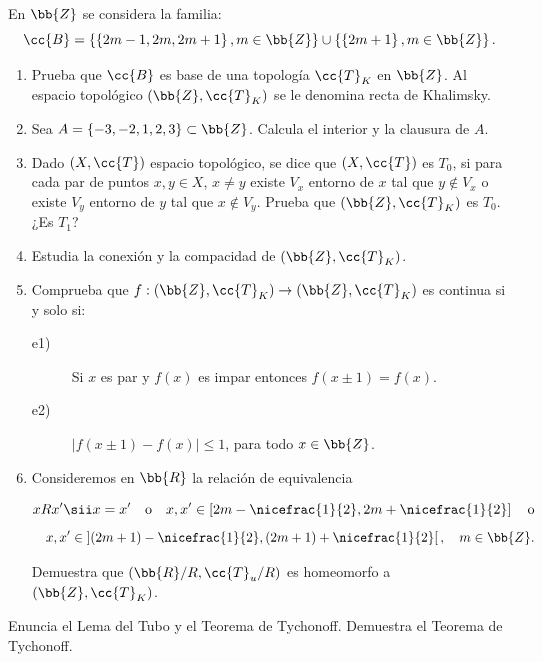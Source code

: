 \documentclass[12pt]{article}
\begin{document}
    \begin{ejercicio}
        En $\bb{Z}$ se considera la familia:
        \[
        \cc{B} = \left\{\left\{2m - 1, 2m, 2m + 1\right\}, m \in \bb{Z}\right\} \cup \left\{\left\{2m + 1\right\}, m \in \bb{Z}\right\}.
        \]
        \begin{enumerate}[label=\alph*)]
            \item Prueba que $\cc{B}$ es base de una topología $\cc{T}_K$ en $\bb{Z}$. Al espacio topológico $(\bb{Z}, \cc{T}_K)$ se le denomina recta de Khalimsky.
            \item Sea $A = \{-3, -2, 1, 2, 3\} \subset \bb{Z}$. Calcula el interior y la clausura de $A$.
            \item Dado $(X, \cc{T})$ espacio topológico, se dice que $(X, \cc{T})$ es $T_0$, si para cada par de puntos $x, y \in X$, $x \neq y$ existe $V_x$ entorno de $x$ tal que $y \notin V_x$ o existe $V_y$ entorno de $y$ tal que $x \notin V_y$. Prueba que $(\bb{Z}, \cc{T}_K)$ es $T_0$. ¿Es $T_1$?
            \item Estudia la conexión y la compacidad de $(\bb{Z}, \cc{T}_K)$.
            \item Comprueba que $f : (\bb{Z}, \cc{T}_K) \to (\bb{Z}, \cc{T}_K)$ es continua si y solo si:
            \begin{description}
                \item[e1)] Si $x$ es par y $f(x)$ es impar entonces $f(x \pm 1) = f(x)$.
                \item[e2)] $|f(x \pm 1) - f(x)| \leq 1$, para todo $x \in \bb{Z}$.
            \end{description}
            \item Consideremos en $\bb{R}$ la relación de equivalencia
            
            $$x R x' \sii x = x' \quad \text{o} \quad x, x' \in \left[2m - \nicefrac{1}{2}, 2m + \nicefrac{1}{2}\right] \quad \text{o} $$ $$ \quad x, x' \in \left](2m+1) - \nicefrac{1}{2}, (2m+1) + \nicefrac{1}{2}\right[, \quad m \in \bb{Z}.$$
            
            Demuestra que $(\bb{R}/R, \cc{T}_u/R)$ es homeomorfo a $(\bb{Z}, \cc{T}_K)$.
        \end{enumerate}
    \end{ejercicio}

    \begin{ejercicio}
        Enuncia el Lema del Tubo y el Teorema de Tychonoff. Demuestra el Teorema de Tychonoff.
    \end{ejercicio}
\end{document}
